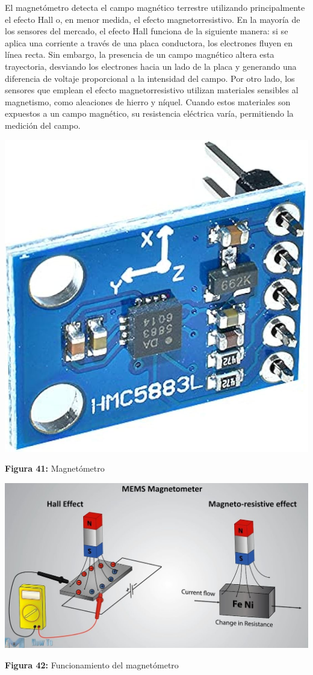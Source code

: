 El magnetómetro detecta el campo magnético terrestre utilizando principalmente el efecto Hall o, en menor medida, el efecto magnetorresistivo. En la mayoría de los sensores del mercado, el efecto Hall funciona de la siguiente manera: si se aplica una corriente a través de una placa conductora, los electrones fluyen en línea recta. Sin embargo, la presencia de un campo magnético altera esta trayectoria, desviando los electrones hacia un lado de la placa y generando una diferencia de voltaje proporcional a la intensidad del campo. Por otro lado, los sensores que emplean el efecto magnetorresistivo utilizan materiales sensibles al magnetismo, como aleaciones de hierro y níquel. Cuando estos materiales son expuestos a un campo magnético, su resistencia eléctrica varía, permitiendo la medición del campo.
\vspace{10pt}  %

\vspace{5mm}

\begin{center}
	\includegraphics[width=0.2\linewidth]{img/magneto}
	
	\vspace{2mm} %
	
	\textbf{Figura 41:} Magnetómetro
\end{center}

\vspace{5mm} %

\begin{center}
	\includegraphics[width=0.6\linewidth]{img/Smagnometro}
	
	\vspace{2mm} %
	
	\textbf{Figura 42:} Funcionamiento del magnetómetro
\end{center}


